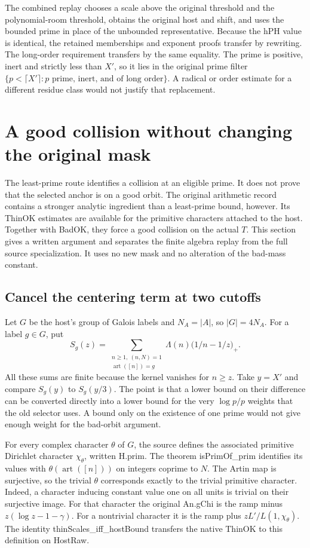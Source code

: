 \documentclass[12pt,letterpaper]{article}
\DeclareRobustCommand{\id}[1]{\mbox{\small\ttfamily #1}}
\begin{document}
The combined replay chooses a scale above the original threshold and the polynomial-room threshold, obtains the original host and shift, and uses the bounded prime in place of the unbounded representative. Because the \id{hPH} value is identical, the retained memberships and exponent proofs transfer by rewriting. The long-order requirement transfers by the same equality. The prime is positive, inert and strictly less than \(X'\), so it lies in the original prime filter \(\{p<\lceil X'\rceil:p\text{ prime, inert, and of long order}\}\). A radical or order estimate for a different residue class would not justify that replacement.

\section{A good collision without changing the original mask}
\label{sec:thin}

The least-prime route identifies a collision at an eligible prime. It does not prove that the selected anchor is on a good orbit. The original arithmetic record contains a stronger analytic ingredient than a least-prime bound, however. Its \id{ThinOK} estimates are available for the primitive characters attached to the host. Together with \id{BadOK}, they force a good collision on the actual \(T\). This section gives a written argument and separates the finite algebra replay from the full source specialization. It uses no new mask and no alteration of the bad-mass constant.

\subsection{Cancel the centering term at two cutoffs}

Let \(G\) be the host's group of Galois labels and \(N_A=|A|\), so \(|G|=4N_A\). For a label \(g\in G\), put
\[
 S_g(z)=
 \sum_{\substack{n\ge1,\ (n,N)=1\\
                 \operatorname{art}([n])=g}}
   \Lambda(n)\bigl(1/n-1/z\bigr)_+ .
\]
All these sums are finite because the kernel vanishes for \(n\ge z\). Take \(y=X'\) and compare \(S_g(y)\) to \(S_g(y/3)\). The point is that a lower bound on their difference can be converted directly into a lower bound for the very \(\log p/p\) weights that the old selector uses. A bound only on the existence of one prime would not give enough weight for the bad-orbit argument.

For every complex character \(\theta\) of \(G\), the source defines the associated primitive Dirichlet character \(\chi_\theta\), written \id{H.prim}. The theorem \id{isPrimOf\_prim} identifies its values with \(\theta(\operatorname{art}([n]))\) on integers coprime to \(N\). The Artin map is surjective, so the trivial \(\theta\) corresponds exactly to the trivial primitive character. Indeed, a character inducing constant value one on all units is trivial on their surjective image. For that character the original \id{An.gChi} is the ramp minus \(z(\log z-1-\gamma)\). For a nontrivial character it is the ramp plus \(zL'/L(1,\chi_\theta)\). The identity \id{thinScales\_iff\_hostBound} transfers the native \id{ThinOK} to this definition on \id{HostRaw}.
\end{document}
